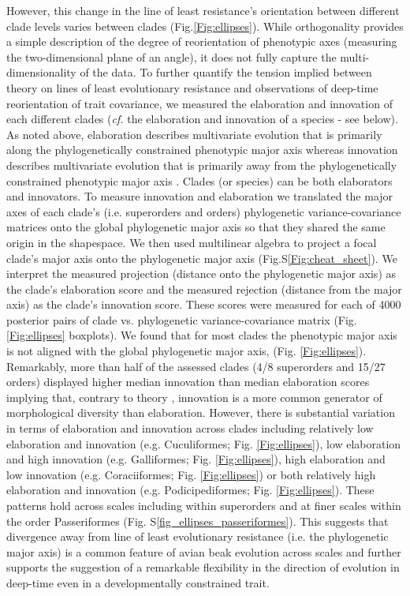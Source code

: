 \documentclass[12pt,letterpaper]{article}
\begin{document}
However, this change in the line of least resistance's orientation between different clade levels varies between clades (Fig.\ref{Fig:ellipses}).
While orthogonality provides a simple description of the degree of reorientation of phenotypic axes (measuring the two-dimensional plane of an angle), it does not fully capture the multi-dimensionality of the data.
To further quantify the tension implied between theory on lines of least evolutionary resistance and observations of deep-time reorientation of trait covariance, we measured the elaboration and innovation of each different clades (\textit{cf.} the elaboration and innovation of a species - see below).
As noted above, elaboration describes multivariate evolution that is primarily along the phylogenetically constrained phenotypic major axis whereas innovation describes multivariate evolution that is primarily away from the phylogenetically constrained phenotypic major axis \cite{endler2005animal}.
Clades (or species) can be both elaborators and innovators.
To measure innovation and elaboration we translated the major axes of each clade's (i.e. superorders and orders) phylogenetic variance-covariance matrices onto the global phylogenetic major axis so that they shared the same origin in the shapespace.
We then used multilinear algebra to project a focal clade's major axis onto the phylogenetic major axis (Fig.S\ref{Fig:cheat_sheet}).
We interpret the measured projection (distance onto the phylogenetic major axis) as the clade's elaboration score and the measured rejection (distance from the major axis) as the clade's innovation score.
These scores were measured for each of 4000 posterior pairs of clade vs. phylogenetic variance-covariance matrix (Fig.\ref{Fig:ellipses} boxplots).
We found that for most clades the phenotypic major axis is not aligned with the global phylogenetic major axis, (Fig. \ref{Fig:ellipses}).
Remarkably, more than half of the assessed clades (4/8 superorders and 15/27 orders) displayed higher median innovation than median elaboration scores implying that, contrary to theory \cite{schluter1996adaptive,marroig2005size}, innovation is a more common generator of morphological diversity than elaboration.
However, there is substantial variation in terms of elaboration and innovation across clades including relatively low elaboration and innovation (e.g. Cuculiformes; Fig. \ref{Fig:ellipses}), low elaboration and high innovation (e.g. Galliformes; Fig. \ref{Fig:ellipses}), high elaboration and low innovation (e.g. Coraciiformes; Fig. \ref{Fig:ellipses}) or both relatively high elaboration and innovation (e.g. Podicipediformes; Fig. \ref{Fig:ellipses}).
These patterns hold across scales including within superorders and at finer scales within the order Passeriformes (Fig. S\ref{fig_ellipses_passeriformes}).
This suggests that divergence away from line of least evolutionary resistance (i.e. the phylogenetic major axis) is a common feature of avian beak evolution across scales and further supports the suggestion of a remarkable flexibility in the direction of evolution in deep-time even in a developmentally constrained trait.
\end{document}
